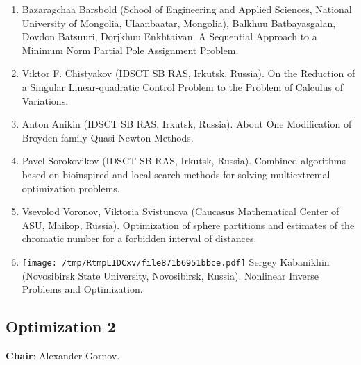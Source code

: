 \documentclass[
]{article}
\providecommand{\tightlist}{%
  \setlength{\itemsep}{0pt}\setlength{\parskip}{0pt}}
\begin{document}
\begin{enumerate}
\def\labelenumi{\arabic{enumi}.}
\tightlist
\item
  Bazaragchaa Barsbold (School of Engineering and Applied Sciences,
  National University of Mongolia, Ulaanbaatar, Mongolia), Balkhuu
  Batbayasgalan, Dovdon Batsuuri, Dorjkhuu Enkhtaivan. A Sequential
  Approach to a Minimum Norm Partial Pole Assignment Problem.
\item
  Viktor F. Chistyakov (IDSCT SB RAS, Irkutsk, Russia). On the Reduction
  of a Singular Linear-quadratic Control Problem to the Problem of
  Calculus of Variations.
\item
  Anton Anikin (IDSCT SB RAS, Irkutsk, Russia). About One Modification
  of Broyden-family Quasi-Newton Methods.
\item
  Pavel Sorokovikov (IDSCT SB RAS, Irkutsk, Russia). Combined algorithms
  based on bioinspired and local search methods for solving
  multiextremal optimization problems.
\item
  Vsevolod Voronov, Viktoria Svistunova (Caucasus Mathematical Center of
  ASU, Maikop, Russia). Optimization of sphere partitions and estimates
  of the chromatic number for a forbidden interval of distances.
\item
  \protect\texttt{[image: /tmp/RtmpLIDCxv/file871b6951bbce.pdf]}
  Sergey Kabanikhin (Novosibirsk State University, Novosibirsk, Russia).
  Nonlinear Inverse Problems and Optimization.
\end{enumerate}

\hypertarget{o2}{%
\subsection{Optimization 2}\label{o2}}

\textbf{Chair}: Alexander Gornov.
\end{document}
